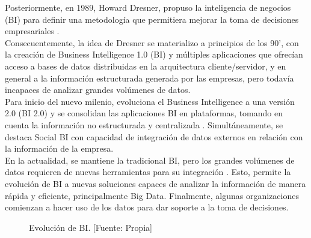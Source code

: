 \documentclass[11pt,titlepage]{report}
\begin{document}
Posteriormente, en 1989, Howard Dresner, propuso la inteligencia de negocios (BI) para definir una metodología que permitiera mejorar la toma de decisiones empresariales \cite{web02}.\\

Consecuentemente, la idea de Dresner se materializo a principios de los 90', con la creación de Business Intelligence 1.0 (BI) y múltiples aplicaciones que ofrecían acceso a bases de datos distribuidas en la arquitectura cliente/servidor, y en general a la información estructurada generada por las empresas, pero todavía incapaces de analizar grandes volúmenes de datos.\\

Para inicio del nuevo milenio, evoluciona el Business Intelligence  a una versión 2.0 (BI 2.0) y se consolidan las aplicaciones BI en plataformas, tomando en cuenta la información no estructurada y centralizada \cite{web01}. Simultáneamente, se destaca Social BI con capacidad de integración de datos externos en relación con la información de la empresa.\\

En la actualidad, se mantiene la tradicional BI, pero los grandes volúmenes de datos requieren de nuevas herramientas para su integración \cite{web01}. Esto, permite la evolución de BI a nuevas soluciones capaces de analizar la información de manera rápida y eficiente, principalmente Big Data. Finalmente, algunas organizaciones comienzan a hacer uso de los datos para dar soporte a la toma de decisiones.


\begin{figure}[h]
	\caption{Evolución de BI. [Fuente: Propia]}
	\centering
	\label{fig:evolucionBI}
\end{figure}
\end{document}
